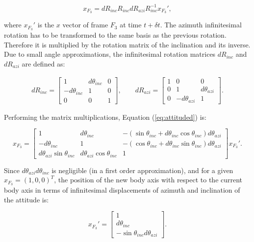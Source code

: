 \begin{equation}
	x_{F_3}=dR_{inc}R_{inc}dR_{azi}R_{inc}^{-1}x_{F_3}',
	\label{eq:attituded}
\end{equation}

where $x_{F_3}'$ is the $x$ vector of frame $F_3$ at time $t+\delta t$.
The azimuth infinitesimal rotation has to be transformed to the same basis as the previous rotation. Therefore it is multiplied by the rotation matrix of the inclination and its inverse. Due to small angle approximations, the infinitesimal rotation matrices $dR_{inc}$ and $dR_{azi}$ are defined as:

\begin{gather*}
	dR_{inc} = 
	\begin{bmatrix}
	1 & d\theta_{inc} & 0 \\
	-d\theta_{inc} & 1 & 0 \\
	0 & 0 & 1
	\end{bmatrix}, \qquad
	dR_{azi} = 
	\begin{bmatrix}
	1 & 0 & 0 \\
	0 & 1 & d\theta_{azi} \\
	0 & -d\theta_{azi} & 1
	\end{bmatrix} .	
\end{gather*}

Performing the matrix multiplications, Equation (\ref{eq:attituded}) is:


\begin{equation}
	x_{F_3}=\begin{bmatrix}
	1 & d\theta_{inc} & -(\sin{\theta_{inc}} + d\theta_{inc}\cos{\theta_{inc}}) d\theta_{azi} \\
	-d\theta_{inc} & 1 & -(\cos{\theta_{inc}} + d\theta_{inc}\sin{\theta_{inc}}) d\theta_{azi} \\
	d\theta_{azi}\sin{\theta_{inc}} & d\theta_{azi}\cos{\theta_{inc}} & 1
	\end{bmatrix} 
			x_{F_3}'.
	\label{eq:attitudedd}
\end{equation}

Since $ d\theta_{azi} d\theta_{inc}$ is negligible (in a first order approximation), and for a given $x_{F_3} = (1,0,0)^T$, the position of the new body axis with respect to the current body axis in terms of infinitesimal displacements of azimuth and inclination of the attitude is:

\begin{equation}
	x_{F_3}' = 
				\begin{bmatrix}
				1 \\
				d\theta_{inc}\\
				-\sin{\theta_{inc}}d\theta_{azi}
				\end{bmatrix}.
\end{equation}


